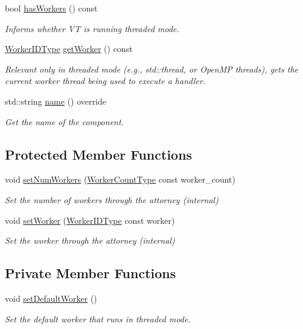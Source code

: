 \begin{DoxyCompactItemize}
bool \hyperlink{structvt_1_1ctx_1_1_context_a17b1fd9fd7bfc2afdd55707d1f321f76}{has\+Workers} () const
\begin{DoxyCompactList}\small\item\em Informs whether VT is running threaded mode. \end{DoxyCompactList}\item 
\hyperlink{namespacevt_a656e362091da17b9b93d0655b36e3392}{Worker\+I\+D\+Type} \hyperlink{structvt_1_1ctx_1_1_context_a1e39e0561109fd30b45a427ddb055cd2}{get\+Worker} () const
\begin{DoxyCompactList}\small\item\em Relevant only in threaded mode (e.\+g., {\ttfamily std\+::thread}, or Open\+MP threads), gets the current worker thread being used to execute a handler. \end{DoxyCompactList}\item 
std\+::string \hyperlink{structvt_1_1ctx_1_1_context_a6bef35c171d45feb409d7b6aa6168996}{name} () override
\begin{DoxyCompactList}\small\item\em Get the name of the component. \end{DoxyCompactList}\end{DoxyCompactItemize}
\subsection*{Protected Member Functions}
\begin{DoxyCompactItemize}
\item 
void \hyperlink{structvt_1_1ctx_1_1_context_afc4549ac9cdae67301613613b9381d1c}{set\+Num\+Workers} (\hyperlink{namespacevt_aa93398ea48f2cb6c188512250f7cc248}{Worker\+Count\+Type} const worker\+\_\+count)
\begin{DoxyCompactList}\small\item\em Set the number of workers through the attorney (internal) \end{DoxyCompactList}\item 
void \hyperlink{structvt_1_1ctx_1_1_context_a32f62f26b7a6977c91186f8c2aa2b16a}{set\+Worker} (\hyperlink{namespacevt_a656e362091da17b9b93d0655b36e3392}{Worker\+I\+D\+Type} const worker)
\begin{DoxyCompactList}\small\item\em Set the worker through the attorney (internal) \end{DoxyCompactList}\end{DoxyCompactItemize}
\subsection*{Private Member Functions}
\begin{DoxyCompactItemize}
\item 
void \hyperlink{structvt_1_1ctx_1_1_context_ab61a961c47c8fc6393df8c121ade3aa2}{set\+Default\+Worker} ()
\begin{DoxyCompactList}\small\item\em Set the default worker that runs in threaded mode. \end{DoxyCompactList}\end{DoxyCompactItemize}
